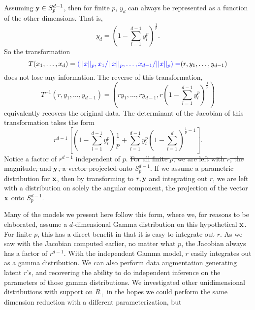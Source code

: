Assuming ${\bf y} \in S_{p}^{d-1}$, then for finite $p$, $y_d$ can always be represented as a
  function of the other dimensions.  That is,
  \begin{equation*}
    y_d = \left(1 - \sum_{l = 1}^{d-1}y_l^p\right)^{\frac{1}{p}}.
  \end{equation*}
  So the transformation
  \begin{equation*}
    T(x_1,\ldots,x_d) = \textcolor{blue}{(||x||_p, x_1/||x||_p, \ldots , x_{d-1}/||x||_p)=} (r,y_1,\ldots,y_{d-1})
  \end{equation*}
  does not lose any information.  The reverse of this transformation,
  \begin{equation*}
    T^{-1}\left(r,y_1,\ldots,y_{d-1}\right) =
      \left(ry_1,\ldots,ry_{d-1},r\left(1 - {\scriptstyle\sum}_{l = 1}^{d-1}y_l^p\right)^{\frac{1}{p}}\right)
  \end{equation*}
  equivalently recovers the original data.  The determinant of the Jacobian of this transformation
  takes the form
  \begin{equation*}
    r^{d-1}\left[\left(1 - \sum_{l = 1}^{d-1}y_l^p\right)\frac{1}{p} +
        \sum_{l = 1}^{d-1}y_l^p\left(1 - \sum_{l=1}^d\right)^{\frac{1}{p} - 1}\right].
  \end{equation*}
  Notice a factor of $r^{d-1}$ independent of $p$.  \sout{For all finite $p$, we are left with $r$, the
  magnitude, and ${\bf y}$, a vector projected onto $S_{p}^{d-1}$}.  If we assume a \sout{parametric}
  distribution for ${\bf x}$, then by transforming to $r, {\bf y}$ and integrating out $r$, we are
  left with a distribution on solely the angular component, the projection of the vector ${\bf x}$
  onto $S_{p}^{d-1}$.

Many of the models we present here follow this form, where we, for reasons to be elaborated, assume
  a $d$-dimensional Gamma distribution on this hypothetical ${\bf x}$. For finite $p$, this has a
  direct benefit in that it is easy to integrate out $r$.  As we saw with the Jacobian computed
  earlier, no matter what $p$, the Jacobian always has a factor of $r^{d-1}$.  With the independent
  Gamma model, $r$ easily integrates out as a gamma distribution.  We can also perform data
  augmentation generating latent $r$'s, and recovering the ability to do independent inference on
  the parameters of those gamma distributions.  We investigated other unidimensional distributions
  with support on $R_+$ in the hopes we could perform the same dimension reduction with a different
  parameterization, but 

